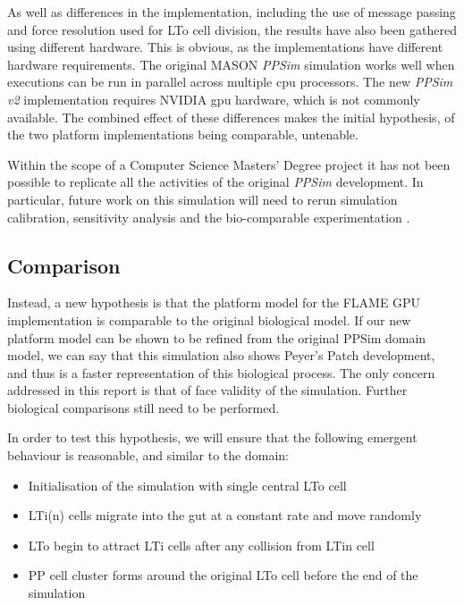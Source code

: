 \documentclass{UoYCSproject}
\begin{document}
As well as differences in the implementation, including the use of message passing and force resolution used for \gls{LTo} cell division, the results have also been gathered using different hardware.
This is obvious, as the implementations have different hardware requirements.
The original \gls{MASON} \textit{PPSim} simulation works well when executions can be run in parallel across multiple \gls{cpu} processors.
The new \textit{PPSim v2} implementation requires NVIDIA \gls{gpu} hardware, which is not commonly available.
The combined effect of these differences makes the initial hypothesis, of the two platform implementations being comparable, untenable.

Within the scope of a Computer Science Masters' Degree project it has not been possible to replicate all the activities of the original \textit{PPSim} development.
In particular, future work on this simulation will need to rerun simulation calibration, sensitivity analysis and the bio-comparable experimentation \cite{kieran_thesis, kieran_results}.

\subsection{Comparison}
Instead, a new hypothesis is that the platform model for the \gls{FLAME GPU} implementation is comparable to the original biological model.
If our new platform model can be shown to be refined from the original PPSim domain model, we can say that this simulation also shows Peyer's Patch development, and thus is a faster representation of this biological process.
The only concern addressed in this report is that of face validity of the simulation.
Further biological comparisons still need to be performed.

In order to test this hypothesis, we will ensure that the following emergent behaviour is reasonable, and similar to the \gls{domain}:
\begin{itemize}
    \item Initialisation of the simulation with single central \gls{LTo} cell
    \item \gls{LTi}(n) cells migrate into the gut at a constant rate and move randomly
    \item \gls{LTo} begin to attract \gls{LTi} cells after any collision from \gls{LTin} cell
    \item \gls{PP} cell cluster forms around the original \gls{LTo} cell before the end of the simulation
\end{itemize}
\end{document}
